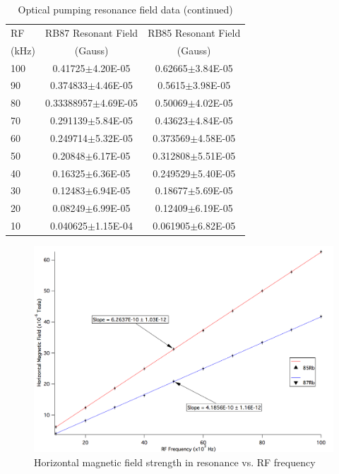 \documentclass[prb,preprint]{revtex4-1}
\begin{document}
\begin{table}[h]
\centering
\caption{Optical pumping resonance field data (continued)}
\begin{ruledtabular}
\begin{tabular}{ l c c}
RF & RB87 Resonant Field & RB85 Resonant Field\\
(kHz) & (Gauss) & (Gauss)\\
\hline
100 & 0.41725$\pm$4.20E-05 & 0.62665$\pm$3.84E-05\\
90 & 0.374833$\pm$4.46E-05 & 0.5615$\pm$3.98E-05\\
80 & 0.33388957$\pm$4.69E-05 & 0.50069$\pm$4.02E-05\\
70 & 0.291139$\pm$5.84E-05 & 0.43623$\pm$4.84E-05\\
60 & 0.249714$\pm$5.32E-05 & 0.373569$\pm$4.58E-05\\
50 & 0.20848$\pm$6.17E-05 & 0.312808$\pm$5.51E-05\\
40 & 0.16325$\pm$6.36E-05 & 0.249529$\pm$5.40E-05\\
30 & 0.12483$\pm$6.94E-05 & 0.18677$\pm$5.69E-05\\
20 &	0.08249$\pm$6.99E-05 & 0.12409$\pm$6.19E-05\\
10 &	0.040625$\pm$1.15E-04 & 0.061905$\pm$6.82E-05\\

\end{tabular}
\end{ruledtabular}
\label{data2}
\end{table}



\begin{figure}[h]
\centering
\includegraphics[width=16cm]{both.png}
\caption{Horizontal magnetic field strength in resonance vs. RF frequency}
\label{both}
\end{figure}
\end{document}
